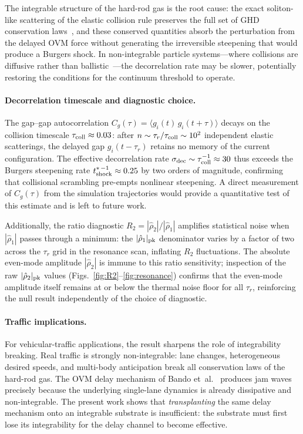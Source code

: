 \documentclass[aps,pre,twocolumn,superscriptaddress,longbibliography,floatfix]{revtex4-2}
\begin{document}
The integrable structure of the hard-rod gas is the root
cause: the exact soliton-like scattering of the elastic
collision rule preserves the full set of GHD conservation
laws~\cite{PaperIV}, and these conserved quantities absorb
the perturbation from the delayed OVM force without
generating the irreversible steepening that would produce a
Burgers shock. In non-integrable particle systems---where
collisions are diffusive rather than
ballistic~\cite{DurninDoyon2021}---the decorrelation rate
may be slower, potentially restoring the conditions for the
continuum threshold to operate.

\paragraph*{Decorrelation timescale and diagnostic choice.}
The gap--gap autocorrelation
$C_g(\tau)=\langle g_i(t)\,g_i(t+\tau)\rangle$ decays on the
collision timescale $\tau_{\rm coll}\approx 0.03$: after
$n\sim\tau_r/\tau_{\rm coll}\sim 10^2$ independent elastic
scatterings, the delayed gap $g_i(t-\tau_r)$ retains no
memory of the current configuration. The effective
decorrelation rate $\sigma_{\rm dec}\sim\tau_{\rm coll}^{-1}
\approx 30$ thus exceeds the Burgers steepening rate
$t_{\rm shock}^{*\,-1}\approx 0.25$ by two orders of
magnitude, confirming that collisional scrambling pre-empts
nonlinear steepening. A direct measurement of $C_g(\tau)$
from the simulation trajectories would provide a quantitative
test of this estimate and is left to future work.

Additionally, the ratio diagnostic
$R_2=|\hat\rho_2|/|\hat\rho_1|$ amplifies statistical
noise when $|\hat\rho_1|$ passes through a minimum: the
$|\hat\rho_1|_{\rm pk}$ denominator varies by a factor of
two across the $\tau_r$ grid in the resonance scan,
inflating $R_2$ fluctuations. The absolute even-mode
amplitude $|\hat\rho_2|$ is immune to this ratio
sensitivity; inspection of the raw $|\hat\rho_2|_{\rm pk}$
values (Figs.~\ref{fig:R2}--\ref{fig:resonance}) confirms
that the even-mode amplitude itself remains at or below
the thermal noise floor for all $\tau_r$, reinforcing the
null result independently of the choice of diagnostic.

\paragraph*{Traffic implications.}
For vehicular-traffic applications, the result sharpens
the role of integrability breaking. Real traffic is
strongly non-integrable: lane changes, heterogeneous
desired speeds, and multi-body anticipation break all
conservation laws of the hard-rod gas. The OVM
delay mechanism of Bando et~al.~\cite{Bando1995} produces
jam waves precisely because the underlying
single-lane dynamics is already dissipative and
non-integrable. The present work shows that
\emph{transplanting} the same delay mechanism onto an
integrable substrate is insufficient: the substrate must
first lose its integrability for the delay channel to
become effective.
\end{document}
